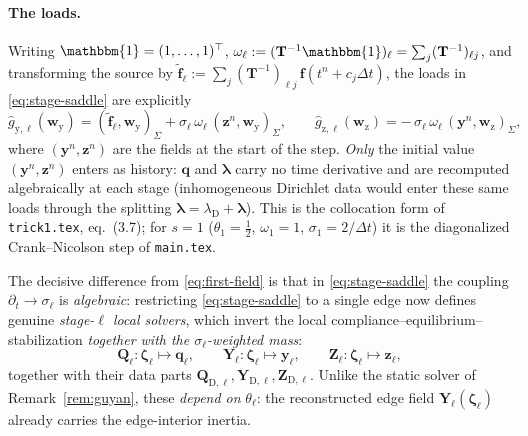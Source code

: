 \documentclass[11pt]{article}
\theoremstyle{remark}
\renewcommand{\vec}{\boldsymbol}
\newcommand{\bvec}[1]{\vec{#1}}
\newcommand{\vldh}{\bvec\lambda}         %
\newcommand{\del}{\partial}
\newcommand{\one}{\mathbbm{1}}
\newcommand{\mT}{\mathbf{T}}
\newcommand{\dt}{\Delta t}
\begin{document}
\paragraph{The loads.}
Writing $\one=(1,\dots,1)^\top$, $\omega_\ell:=(\mT^{-1}\one)_\ell
=\sum_{j}(\mT^{-1})_{\ell j}$, and transforming the source by
$\widetilde{\vec f}_\ell:=\sum_{j}(\mT^{-1})_{\ell j}\,\vec f(t^n+c_j\dt)$, the
loads in \eqref{eq:stage-saddle} are explicitly
\begin{equation}\label{eq:stage-loads}
  \widehat g_{\mathrm y,\ell}(\bvec w_{\mathrm y})
    = (\widetilde{\vec f}_\ell,\bvec w_{\mathrm y})_\Sigma
      +\sigma_\ell\,\omega_\ell\,(\bvec z^n,\bvec w_{\mathrm y})_\Sigma,
  \qquad
  \widehat g_{\mathrm z,\ell}(\bvec w_{\mathrm z})
    = -\,\sigma_\ell\,\omega_\ell\,(\bvec y^n,\bvec w_{\mathrm z})_\Sigma,
\end{equation}
where $(\bvec y^n,\bvec z^n)$ are the fields at the start of the step. \emph{Only}
the initial value $(\bvec y^n,\bvec z^n)$ enters as history: $\bvec q$ and $\vldh$
carry no time derivative and are recomputed algebraically at each stage
(inhomogeneous Dirichlet data would enter these same loads through the splitting
$\vldh=\lambda_{\mathrm D}+\vldh$). This is the collocation form of
\texttt{trick1.tex}, eq.~(3.7); for $s=1$ ($\theta_1=\tfrac12$, $\omega_1=1$,
$\sigma_1=2/\dt$) it is the diagonalized Crank--Nicolson step of \texttt{main.tex}.

The decisive difference from \eqref{eq:first-field} is that in
\eqref{eq:stage-saddle} the coupling $\del_t\to\sigma_\ell$ is \emph{algebraic}:
restricting \eqref{eq:stage-saddle} to a single edge now defines genuine
\emph{stage-$\ell$ local solvers}, which invert the local
compliance--equilibrium--stabilization \emph{together with the
$\sigma_\ell$-weighted mass}:
\begin{equation}\label{eq:stage-locsolve}
  \bvec Q_\ell:\vec\zeta_\ell\mapsto\bvec q_\ell,\qquad
  \bvec Y_\ell:\vec\zeta_\ell\mapsto\bvec y_\ell,\qquad
  \bvec Z_\ell:\vec\zeta_\ell\mapsto\bvec z_\ell,
\end{equation}
together with their data parts $\bvec Q_{\mathrm D,\ell},\bvec Y_{\mathrm
D,\ell},\bvec Z_{\mathrm D,\ell}$. Unlike the static solver of
Remark~\ref{rem:guyan}, these \emph{depend on} $\theta_\ell$: the reconstructed
edge field $\bvec Y_\ell(\vec\zeta_\ell)$ already carries the edge-interior
inertia.
\end{document}

